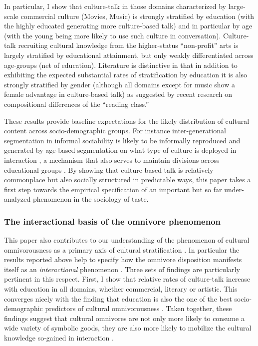 \documentclass[11pt]{article}
\begin{document}
In particular, I show that culture-talk in those domains characterized by large-scale commercial culture (Movies, Music) is strongly stratified by education (with the highly educated generating more culture-based talk) and in particular by age (with the young being more likely to use such culture in conversation). Culture-talk recruiting cultural knowledge from the higher-status ``non-profit'' arts is largely stratified by educational attainment, but only weakly differentiated across age-groups (net of education).  Literature is distinctive in that in addition to exhibiting the expected substantial rates of stratification by education it is also strongly stratified by gender (although all domains except for music show a female advantage in culture-based talk) as suggested by recent research on compositional differences of the ``reading class.''  

These results provide baseline expectations for the likely distribution of cultural content across socio-demographic groups.  For instance inter-generational segmentation in informal sociability is likely to be informally reproduced and generated by age-based segmentation on what type of culture is deployed in interaction \citep{milner04}, a mechanism that also serves to maintain divisions across educational groups \citep{collins75}.   By showing that culture-based talk is relatively commonplace but also socially structured in predictable ways, this paper takes a first step towards the empirical specification of an important but so far under-analyzed phenomenon in the sociology of taste.  

\subsubsection{The interactional basis of the omnivore phenomenon}
This paper also contributes to our understanding of the phenomenon of cultural omnivorousness as a primary axis of cultural stratification \citep{peterson92, peterson_kern96}.  In particular the results reported above help to specify how the omnivore disposition manifests itself as an \emph{interactional} phenomenon \citep{ollivier08}. Three sets of findings are particularly pertinent in this respect.  First, I show that relative rates of culture-talk increase with education in all domains, whether commercial, literary or artistic. This converges nicely with the finding that education is also the one of the best socio-demographic predictors of cultural omnivorousness \citep{warde_etal08, peterson_rossman08, lopez-sintas_katz-gerro05}.   Taken together, these findings suggest that cultural omnivores are not only more likely to consume a wide variety of symbolic goods, they are also more likely to mobilize the cultural knowledge so-gained in interaction \citep{peterson92, dimaggio96, lizardo06a}. 
\end{document}
